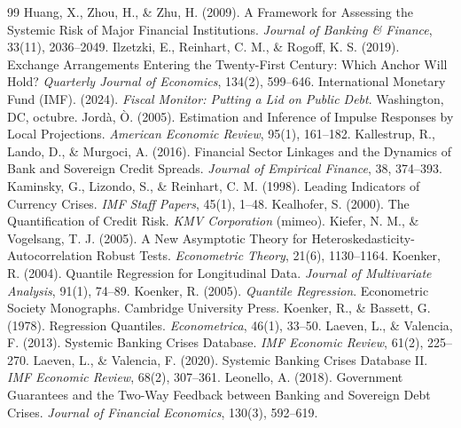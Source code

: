 \begin{thebibliography}{99}
 Huang, X., Zhou, H., \& Zhu, H. (2009). A Framework for Assessing the Systemic Risk of Major Financial Institutions. \textit{Journal of Banking \& Finance}, 33(11), 2036--2049.
 Ilzetzki, E., Reinhart, C. M., \& Rogoff, K. S. (2019). Exchange Arrangements Entering the Twenty-First Century: Which Anchor Will Hold? \textit{Quarterly Journal of Economics}, 134(2), 599--646.
 International Monetary Fund (IMF). (2024). \textit{Fiscal Monitor: Putting a Lid on Public Debt}. Washington, DC, octubre.
 Jordà, Ò. (2005). Estimation and Inference of Impulse Responses by Local Projections. \textit{American Economic Review}, 95(1), 161--182.
 Kallestrup, R., Lando, D., \& Murgoci, A. (2016). Financial Sector Linkages and the Dynamics of Bank and Sovereign Credit Spreads. \textit{Journal of Empirical Finance}, 38, 374--393.
 Kaminsky, G., Lizondo, S., \& Reinhart, C. M. (1998). Leading Indicators of Currency Crises. \textit{IMF Staff Papers}, 45(1), 1--48.
 Kealhofer, S. (2000). The Quantification of Credit Risk. \textit{KMV Corporation} (mimeo).
 Kiefer, N. M., \& Vogelsang, T. J. (2005). A New Asymptotic Theory for Heteroskedasticity-Autocorrelation Robust Tests. \textit{Econometric Theory}, 21(6), 1130--1164.
 Koenker, R. (2004). Quantile Regression for Longitudinal Data. \textit{Journal of Multivariate Analysis}, 91(1), 74--89.
 Koenker, R. (2005). \textit{Quantile Regression}. Econometric Society Monographs. Cambridge University Press.
 Koenker, R., \& Bassett, G. (1978). Regression Quantiles. \textit{Econometrica}, 46(1), 33--50.
 Laeven, L., \& Valencia, F. (2013). Systemic Banking Crises Database. \textit{IMF Economic Review}, 61(2), 225--270.
 Laeven, L., \& Valencia, F. (2020). Systemic Banking Crises Database II. \textit{IMF Economic Review}, 68(2), 307--361.
 Leonello, A. (2018). Government Guarantees and the Two-Way Feedback between Banking and Sovereign Debt Crises. \textit{Journal of Financial Economics}, 130(3), 592--619.

\end{thebibliography}
